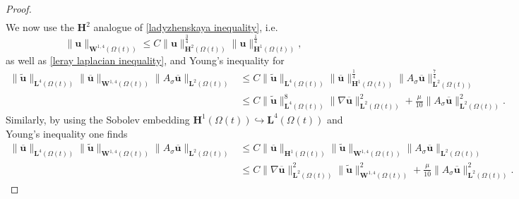 \documentclass[a4paper]{amsart}
\numberwithin{equation}{section}
\newcommand{\grad}{\nabla}
\theoremstyle{plain}
\newcommand{\mbf}[1]{\mathbf{#1}}
\begin{document}
\begin{proof}
\begin{multline}
    \end{multline}
    We now use the $\mbf{H}^2$ analogue of \eqref{ladyzhenskaya inequality}, i.e.
    \[\|\mbf{u}\|_{\mbf{W}^{1,4}(\Omega(t))} \leq C \|\mbf{u}\|_{\mbf{H}^2(\Omega(t))}^{\frac{3}{4}}\|\mbf{u}\|_{\mbf{H}^1(\Omega(t))}^{\frac{1}{4}},\]
    as well as \eqref{leray laplacian inequality}, and Young's inequality for
    \begin{align*}
    \| \widetilde{\mbf{u}}\|_{\mbf{L}^4(\Omega(t))} \| \overline{\mbf{u}}\|_{\mbf{W}^{1,4}(\Omega(t))}\| A_{\sigma}\overline{\mbf{u}} \|_{\mbf{L}^2(\Omega(t))} &\leq C \| \widetilde{\mbf{u}}\|_{\mbf{L}^4(\Omega(t))} \| \overline{\mbf{u}}\|_{\mbf{H}^{1}(\Omega(t))}^{\frac{1}{4}}\| A_{\sigma}\overline{\mbf{u}} \|_{\mbf{L}^2(\Omega(t))}^{\frac{7}{4}}\\
    &\leq C \| \widetilde{\mbf{u}}\|_{\mbf{L}^4(\Omega(t))}^8 \| \grad \overline{\mbf{u}}\|_{\mbf{L}^{2}(\Omega(t))}^2 + \frac{\mu}{10}\| A_{\sigma}\overline{\mbf{u}} \|_{\mbf{L}^2(\Omega(t))}^2.
    \end{align*}
    Similarly, by using the Sobolev embedding $\mbf{H}^1(\Omega(t)) \hookrightarrow \mbf{L}^4(\Omega(t))$ and Young's inequality one finds
    \begin{align*}
        \| \overline{\mbf{u}}\|_{\mbf{L}^4(\Omega(t))} \| \widetilde{\mbf{u}}\|_{\mbf{W}^{1,4}(\Omega(t))}\| A_{\sigma}\overline{\mbf{u}} \|_{\mbf{L}^2(\Omega(t))}
        &\leq C\| \overline{\mbf{u}}\|_{\mbf{H}^1(\Omega(t))} \| \widetilde{\mbf{u}}\|_{\mbf{W}^{1,4}(\Omega(t))}\| A_{\sigma}\overline{\mbf{u}} \|_{\mbf{L}^2(\Omega(t))}\\
        &\leq C\|\grad \overline{\mbf{u}}\|_{\mbf{L}^2(\Omega(t))}^2 \| \widetilde{\mbf{u}}\|_{\mbf{W}^{1,4}(\Omega(t))}^2 + \frac{\mu}{10}\| A_{\sigma}\overline{\mbf{u}} \|_{\mbf{L}^2(\Omega(t))}^2.
    \end{align*}
    

\end{proof}
\end{document}

